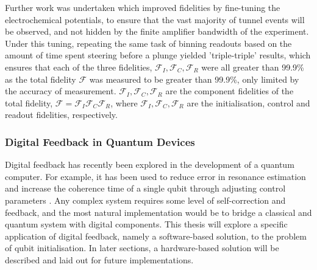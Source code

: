 	Further work was undertaken which improved fidelities by fine-tuning the electrochemical potentials, to ensure that the vast majority of tunnel events will be observed, and not hidden by the finite amplifier bandwidth of the experiment. Under this tuning, repeating the same task of binning readouts based on the amount of time spent steering before a plunge yielded 'triple-triple' results, which ensures that each of the three fidelities, $\mathcal{F}_I, \mathcal{F}_C, \mathcal{F}_R$ were all greater than 99.9\% as the total fidelity $\mathcal{F}$ was measured to be greater than 99.9\%, only limited by the accuracy of measurement. $\mathcal{F}_I, \mathcal{F}_C, \mathcal{F}_R$ are the component fidelities of the total fidelity, $\mathcal{F} = \mathcal{F}_I \mathcal{F}_C \mathcal{F}_R$, where $\mathcal{F}_I, \mathcal{F}_C, \mathcal{F}_R$ are the initialisation, control and readout fidelities, respectively.

\subsubsection{Digital Feedback in Quantum Devices}

	Digital feedback has recently been explored in the development of a quantum computer. For example, it has been used to reduce error in resonance estimation \cite{bonato2015optimized} and increase the coherence time of a single qubit through adjusting control parameters \cite{shulman2014suppressing}. Any complex system requires some level of self-correction and feedback, and the most natural implementation would be to bridge a classical and quantum system with digital components. This thesis will explore a specific application of digital feedback, namely a software-based solution, to the problem of qubit initialisation. In later sections, a hardware-based solution will be described and laid out for future implementations.
